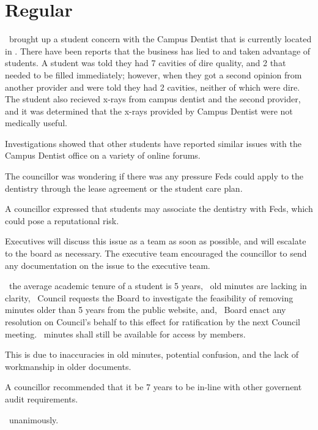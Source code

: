 
\section*{Regular}

\begin{information}
    \seneca\ brought up a student concern with the Campus Dentist that is
    currently located in \slc. There have been reports that the business has
    lied to and taken advantage of students. A student was told they had 7
    cavities of dire quality, and 2 that needed to be filled immediately;
    however, when they got a second opinion from another provider and were told
    they had 2 cavities, neither of which were dire. The student also recieved
    x-rays from campus dentist and the second provider, and it was determined
    that the x-rays provided by Campus Dentist were not medically useful.

    Investigations showed that other students have reported similar issues with
    the Campus Dentist office on a variety of online forums.

    The councillor was wondering if there was any pressure Feds could apply to
    the dentistry through the lease agreement or the student care plan.

    A councillor expressed that students may associate the dentistry with Feds,
    which could pose a reputational risk.

    Executives will discuss this issue as a team as soon as possible, and will
    escalate to the board as necessary. The executive team encouraged the
    councillor to send any documentation on the issue to the executive team.

\end{information}

\begin{motion}
    \whereas\ the average academic tenure of a student is 5 years,
    \whereas\ old minutes are lacking in clarity,
    \birt\ Council requests the Board to investigate the feasibility of 
    removing minutes older than 5 years from the public website, and,
    \bifrt\ Board enact any resolution on Council's behalf to this effect for
    ratification by the next Council meeting.
    \bifrt\ minutes shall still be available for access by members.
    \movers{\nickta}{\stephenie}

    This is due to inaccuracies in old minutes, potential confusion, and the
    lack of workmanship in older documents.

    A councillor recommended that it be 7 years to be in-line with other
    governent audit requirements.

    \carries\ unanimously. 

\end{motion}

